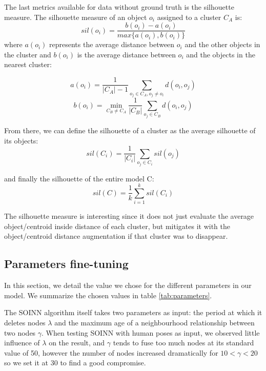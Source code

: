 The last metrics available for data without ground truth is the silhouette measure. The silhouette measure of an object $o_i$ assigned to a cluster $C_A$ is:
\begin{equation}
    sil(o_i)= \frac{b(o_i) - a(o_i)}{max\{a(o_i), b(o_i)\}}
\end{equation}
where $a(o_i)$ represents the average distance between $o_i$ and the other objects in the cluster and $b(o_i)$ is the average distance between $o_i$ and the objects in the nearest cluster:

\begin{equation}
    a(o_i) = \frac{1}{|C_A|-1}\sum_{o_j \in C_A, o_j \neq o_i}d(o_i, o_j)
\end{equation}
\begin{equation}
    b(o_i)= \min_{C_B \neq C_A} \frac{1}{|C_B|} \sum_{o_j \in C_B}d(o_i, o_j)
\end{equation}

From there, we can define the silhouette of a cluster as the average silhouette of its objects:
\begin{equation}
    sil(C_i)=\frac{1}{|C_i|} \sum_{o_j \in C_i}sil(o_j)
\end{equation}

and finally the silhouette of the entire model C:
\begin{equation}
    sil(C)= \frac{1}{k} \sum_{i=1}^k sil(C_i)
\end{equation}

The silhouette measure is interesting since it does not just evaluate the average object/centroid inside distance of each cluster, but mitigates it with the object/centroid distance augmentation if that cluster was to disappear.

\subsection{Parameters fine-tuning}
In this section, we detail the value we chose for the different parameters in our model. We summarize the chosen values in table \ref{tab:parameters}.

The SOINN algorithm itself takes two parameters as input: the period at which it deletes nodes $\lambda$ and the maximum age of a neighbourhood relationship between two nodes $\gamma$. When testing SOINN with human poses as input, we observed little influence of $\lambda$ on the result, and $\gamma$ tends to fuse too much nodes at its standard value of 50, however the number of nodes increased dramatically for $10 < \gamma < 20$ so we set it at 30 to find a good compromise.

